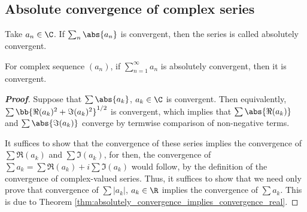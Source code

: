 \subsection{Absolute convergence of complex series}

\begin{definition}
Take $a_n\in\C$. If $\sum_n\abs{a_n}$ is convergent, then the series is called absolutely convergent.
\end{definition}

\begin{theorem}\label{thm:absolutely_convergence_implies_convergence_complex}
For complex sequence $(a_n)$, if $\sum_{n=1}^{\infty} a_n$ is absolutely convergent, then it is convergent.
\end{theorem}

\begin{proof}[{\bf Proof}]
Suppose that $\sum \abs{a_{k}}$, $a_{k}\in \C$ is convergent. Then equivalently, $\sum \bb{\Re(a_{k})^{2}+\Im(a_{k})^{2}}^{1/2}$ is convergent, which implies that $\sum \abs{\Re (a_{k})} $ and $\sum \abs{\Im (a_{k})}$ converge by termwise comparison of non-negative terms. 

It suffices to show that the convergence of these series implies the convergence of $\sum \Re(a_{k})$ and $\sum \Im(a_{k})$, for then, the convergence of $\sum a_{k}=\sum \Re(a_{k})+i\sum \Im (a_{k})$ would follow, by the definition of the convergence of complex-valued series. Thus, it suffices to show that we need only prove that convergence of $\sum |a_{k}|$, $a_{k}\in \R$ implies the convergence of $\sum a_{k}$. This is due to Theorem \ref{thm:absolutely_convergence_implies_convergence_real}.
\end{proof}



